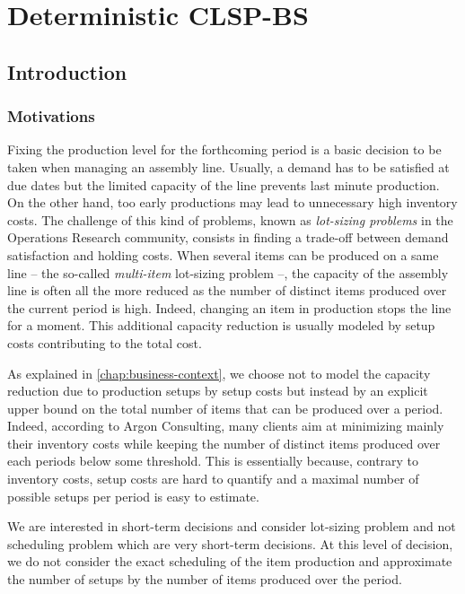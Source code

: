 \chapter{Deterministic CLSP-BS}
\label{chap:PDP:deterministic}


\section{Introduction}


\subsection{Motivations}
\label{sec:PDP:deterministic:introduction:motivations}


Fixing the production level for the forthcoming period is a basic decision to be taken when managing an assembly line.
Usually, a demand has to be satisfied at due dates but the limited capacity of the line prevents last minute production.
On the other hand, too early productions may lead to unnecessary high inventory costs.
The challenge of this kind of problems, known as {\em lot-sizing problems} in the Operations Research community, consists in finding a trade-off between demand satisfaction and holding costs.
When several items can be produced on a same line -- the so-called {\em multi-item} lot-sizing problem --, the capacity of the assembly line is often all the more reduced as the number of distinct items produced over the current period is high.
Indeed, changing an item in production stops the line for a moment.
This additional capacity reduction is usually modeled by setup costs contributing to the total cost.


As explained in \cref{chap:business-context}, we choose not to model the capacity reduction due to production setups by setup costs but instead by an explicit upper bound on the total number of items that can be produced over a period.
Indeed, according to Argon Consulting, many clients aim at minimizing mainly their inventory costs while keeping the number of distinct items produced over each periods below some threshold.
This is essentially because, contrary to inventory costs, setup costs are hard to quantify and a maximal number of possible setups per period is easy to estimate.


We are interested in short-term decisions and consider lot-sizing problem and not scheduling problem which are very short-term decisions.
At this level of decision, we do not consider the exact scheduling of the item production and approximate the number of setups by the number of items produced over the period.


